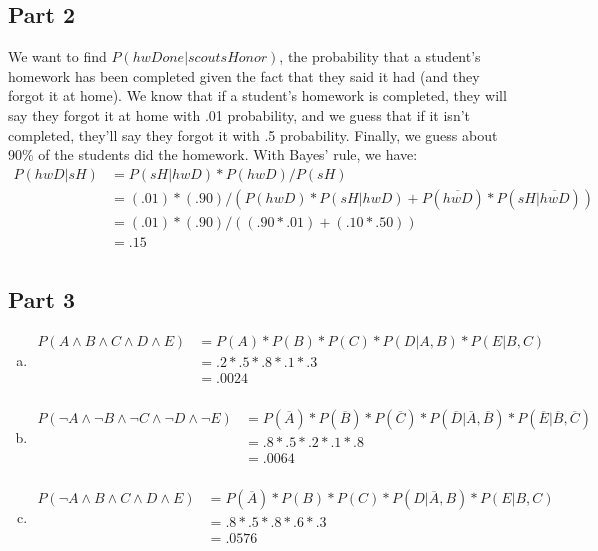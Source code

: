 \documentclass[11pt]{article}
\begin{document}
\subsection*{Part 2}
We want to find $P(hwDone|scoutsHonor)$, the probability that a student's homework has been completed given the fact that they said it had (and they forgot it at home). We know that if a student's homework is completed, they will say they forgot it at home with .01 probability, and we guess that if it isn't completed, they'll say they forgot it with .5 probability. Finally, we guess about 90\% of the students did the homework. With Bayes' rule, we have:
 \begin{align*}
P(hwD|sH) &= P(sH|hwD) *P(hwD) / P(sH) \\
&= (.01) * (.90) / (P(hwD)*P(sH|hwD) + P(\overline{hwD})*P(sH| \overline{hwD})) \\
&= (.01) * (.90) / ((.90*.01)+(.10*.50))\\
&= .15\\
\end{align*}
\subsection*{Part 3}
\begin{enumerate}[a.]
\item \begin{align*}
P(A \land B \land C \land D \land E) &= P(A) * P(B) * P(C) * P(D|A,B) * P(E|B,C)\\
&= .2 * .5 * .8 * .1 * .3\\
&= .0024\\
\end{align*}
\item \begin{align*}
P(\lnot A \land \lnot B \land \lnot  C \land \lnot D \land \lnot E) &= P(\overline{A}) * P(\overline{B}) * P(\overline{C}) * P(\overline{D}|\overline{A},\overline{B}) * P(\overline{E}|\overline{B},\overline{C})\\
&= .8 * .5 * .2 * .1 * .8\\
&= .0064\\
\end{align*}
\item \begin{align*}
P(\lnot A \land B \land C \land D \land E) &= P(\overline{A}) * P(B) * P(C) * P(D|\overline{A},B) * P(E|B,C)\\
&= .8 * .5 * .8 * .6 * .3\\
&= .0576\\
\end{align*}
\end{enumerate}
\end{document}
